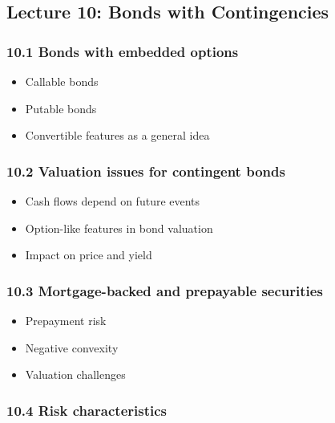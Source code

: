 \documentclass[
  letterpaper,
  DIV=11,
  numbers=noendperiod]{scrartcl}
\providecommand{\tightlist}{%
  \setlength{\itemsep}{0pt}\setlength{\parskip}{0pt}}
\begin{document}
\subsection{Lecture 10: Bonds with
Contingencies}\label{lecture-10-bonds-with-contingencies}

\subsubsection{10.1 Bonds with embedded
options}\label{bonds-with-embedded-options}

\begin{itemize}
\tightlist
\item
  Callable bonds
\item
  Putable bonds
\item
  Convertible features as a general idea
\end{itemize}

\subsubsection{10.2 Valuation issues for contingent
bonds}\label{valuation-issues-for-contingent-bonds}

\begin{itemize}
\tightlist
\item
  Cash flows depend on future events
\item
  Option-like features in bond valuation
\item
  Impact on price and yield
\end{itemize}

\subsubsection{10.3 Mortgage-backed and prepayable
securities}\label{mortgage-backed-and-prepayable-securities}

\begin{itemize}
\tightlist
\item
  Prepayment risk
\item
  Negative convexity
\item
  Valuation challenges
\end{itemize}

\subsubsection{10.4 Risk characteristics}\label{risk-characteristics}
\end{document}
